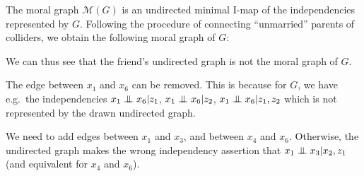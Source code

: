   \begin{solution}
    The moral graph $\mathcal{M}(G)$ is an undirected minimal I-map of
    the independencies represented by $G$. Following the procedure of
    connecting ``unmarried'' parents of colliders, we obtain the following moral graph of $G$:
 
    \begin{center}
    \end{center}
    We can thus see that the friend's undirected graph is not the
    moral graph of $G$.

    The edge between $x_1$ and $x_6$ can be removed. This is because
    for $G$, we have e.g.\ the independencies $x_1 \mathrel{\perp\mspace{-10mu}\perp} x_6 |
    z_1$, $x_1 \mathrel{\perp\mspace{-10mu}\perp} x_6 | z_2$, $x_1 \mathrel{\perp\mspace{-10mu}\perp} x_6 | z_1,
    z_2$ which is not represented by the drawn undirected
    graph.
    
    We need to add edges between $x_1$ and $x_3$, and between $x_4$
    and $x_6$. Otherwise, the undirected graph makes the wrong
    independency assertion that $x_1 \mathrel{\perp\mspace{-10mu}\perp} x_3 | x_2, z_1$ (and
    equivalent for $x_4$ and $x_6$).
   
  \end{solution}

  
\label{ex:undirected-to-DAG}

